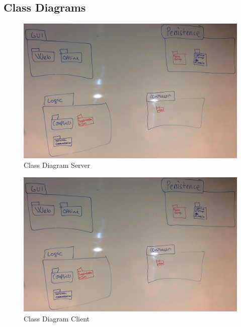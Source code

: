 \subsection{Class Diagrams}
\begin{figure}[H]
  \includegraphics[width=\textwidth,natwidth=2631,natheight=1660]{illustrations/PackageDiagram.jpg}
  \caption{Class Diagram Server}
  \label{classdiagramserver}
\end{figure}
\begin{figure}[H]
  \includegraphics[width=\textwidth,natwidth=2631,natheight=1660]{illustrations/PackageDiagram.jpg}
  \caption{Class Diagram Client}
  \label{classdiagramclient}
\end{figure}
